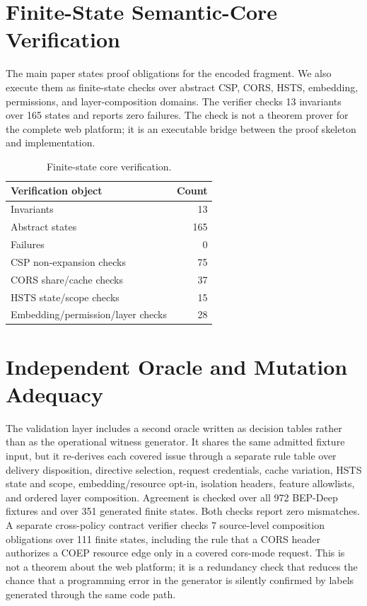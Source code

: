 \documentclass[10pt,conference]{IEEEtran}
\begin{document}
\section{Finite-State Semantic-Core Verification}

The main paper states proof obligations for the encoded fragment. We also execute them as finite-state checks over abstract CSP, CORS, HSTS, embedding, permissions, and layer-composition domains. The verifier checks 13 invariants over 165 states and reports zero failures. The check is not a theorem prover for the complete web platform; it is an executable bridge between the proof skeleton and implementation.

\begin{table}[t]
\centering
\caption{Finite-state core verification.}
\label{tab:supp-core-verification}
\begin{tabular}{lr}
\toprule
Verification object & Count \\
\midrule
Invariants & 13 \\
Abstract states & 165 \\
Failures & 0 \\
CSP non-expansion checks & 75 \\
CORS share/cache checks & 37 \\
HSTS state/scope checks & 15 \\
Embedding/permission/layer checks & 28 \\
\bottomrule
\end{tabular}
\end{table}


\section{Independent Oracle and Mutation Adequacy}

The validation layer includes a second oracle written as decision tables rather than as the operational witness generator.  It shares the same admitted fixture input, but it re-derives each covered issue through a separate rule table over delivery disposition, directive selection, request credentials, cache variation, HSTS state and scope, embedding/resource opt-in, isolation headers, feature allowlists, and ordered layer composition.  Agreement is checked over all 972 BEP-Deep fixtures and over 351 generated finite states.  Both checks report zero mismatches.  A separate cross-policy contract verifier checks 7 source-level composition obligations over 111 finite states, including the rule that a CORS header authorizes a COEP resource edge only in a covered cors-mode request. This is not a theorem about the web platform; it is a redundancy check that reduces the chance that a programming error in the generator is silently confirmed by labels generated through the same code path.
\end{document}

